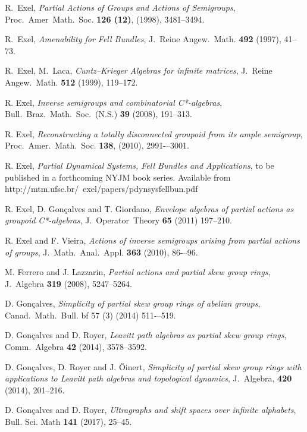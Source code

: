 \documentclass[11pt, a4paper]{amsart}
\theoremstyle{plain}
\begin{document}
\begin{thebibliography}{99}
 R.\ Exel, \textit{Partial Actions of Groups and Actions of Semigroups},  Proc.\ Amer\ Math.\ Soc. {\bf 126 (12)},  (1998), 3481--3494.

 R.\ Exel,  \textit{Amenability for Fell Bundles},  J.\ Reine Angew.\ Math. {\bf 492} (1997), 41--73.

 R.\ Exel, M.\ Laca,  \textit{Cuntz--Krieger Algebras for infinite matrices},  J.\ Reine Angew.\ Math. {\bf 512} (1999), 119--172.

 R. Exel, \textit{Inverse semigroups and combinatorial C*-algebras},	Bull.\ Braz.\ Math.\ Soc.\ (N.S.) {\bf 39}  (2008), 191--313.

 R. Exel, \textit{Reconstructing a totally disconnected groupoid from its ample semigroup}, Proc.\ Amer.\ Math.\ Soc. {\bf 138}, (2010), 2991-–3001.

 R. Exel, \textit{Partial Dynamical Systems, Fell Bundles and Applications}, to be published in a forthcoming NYJM book series. Available from http://mtm.ufsc.br/~exel/papers/pdynsysfellbun.pdf

 R. Exel, D. Gonçalves and T. Giordano, \textit{Envelope algebras of partial actions as groupoid C*-algebras}, J.\ Operator\ Theory {\bf 65} (2011) 197--210.

 R. Exel and F. Vieira,  \textit{Actions of inverse semigroups arising from partial actions of groups}, J.\ Math.\ Anal.\ Appl.  {\bf 363} (2010), 86-–96.

 M. Ferrero and J. Lazzarin, \textit{Partial actions and partial skew group rings}, J.\ Algebra {\bf 319} (2008), 5247--5264.

 D. Gonçalves, \textit{ Simplicity of partial skew group rings of abelian groups}, Canad.\ Math.\ Bull. {bf 57 (3)} (2014) 511-–519.

  D. Gonçalves and D. Royer, \textit{Leavitt path algebras as partial skew group rings}, Comm.\ Algebra {\bf 42} (2014), 3578--3592.

 D. Gonçalves,  D. Royer and J. Öinert, \textit{Simplicity of partial skew group rings with applications to Leavitt path algebras and topological dynamics}, J.\ Algebra, {\bf 420} (2014), 201--216.

 D. Gonçalves and D. Royer, \textit{ Ultragraphs and shift spaces over infinite alphabets}, Bull. Sci. Math {\bf 141} (2017), 25--45.


\end{thebibliography}
\end{document}
